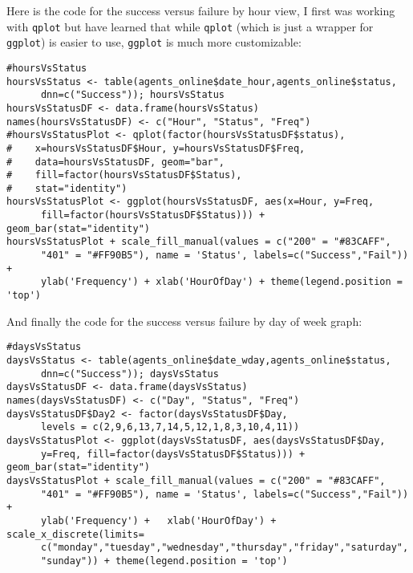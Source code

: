 \documentclass[10pt]{article}
\begin{document}
Here is the code for the success versus failure by hour view, I first was working with \verb|qplot| but have learned that while \verb|qplot| (which is just a wrapper for \verb|ggplot|) is easier to use, \verb|ggplot| is much more customizable:
\begin{verbatim}
#hoursVsStatus
hoursVsStatus <- table(agents_online$date_hour,agents_online$status, 
      dnn=c("Success")); hoursVsStatus
hoursVsStatusDF <- data.frame(hoursVsStatus)
names(hoursVsStatusDF) <- c("Hour", "Status", "Freq")
#hoursVsStatusPlot <- qplot(factor(hoursVsStatusDF$status), 
#    x=hoursVsStatusDF$Hour, y=hoursVsStatusDF$Freq, 
#    data=hoursVsStatusDF, geom="bar", 
#    fill=factor(hoursVsStatusDF$Status), 
#    stat="identity") 
hoursVsStatusPlot <- ggplot(hoursVsStatusDF, aes(x=Hour, y=Freq, 
      fill=factor(hoursVsStatusDF$Status))) + geom_bar(stat="identity")
hoursVsStatusPlot + scale_fill_manual(values = c("200" = "#83CAFF", 
      "401" = "#FF90B5"), name = 'Status', labels=c("Success","Fail")) + 
      ylab('Frequency') + xlab('HourOfDay') + theme(legend.position = 'top')
\end{verbatim}
And finally the code for the success versus failure by day of week graph:
\begin{verbatim}
#daysVsStatus
daysVsStatus <- table(agents_online$date_wday,agents_online$status, 
      dnn=c("Success")); daysVsStatus
daysVsStatusDF <- data.frame(daysVsStatus)
names(daysVsStatusDF) <- c("Day", "Status", "Freq")
daysVsStatusDF$Day2 <- factor(daysVsStatusDF$Day, 
      levels = c(2,9,6,13,7,14,5,12,1,8,3,10,4,11))
daysVsStatusPlot <- ggplot(daysVsStatusDF, aes(daysVsStatusDF$Day, 
      y=Freq, fill=factor(daysVsStatusDF$Status))) + geom_bar(stat="identity")
daysVsStatusPlot + scale_fill_manual(values = c("200" = "#83CAFF", 
      "401" = "#FF90B5"), name = 'Status', labels=c("Success","Fail")) + 
      ylab('Frequency') +   xlab('HourOfDay') + scale_x_discrete(limits=
      c("monday","tuesday","wednesday","thursday","friday","saturday",
      "sunday")) + theme(legend.position = 'top')
\end{verbatim}
\end{document}
